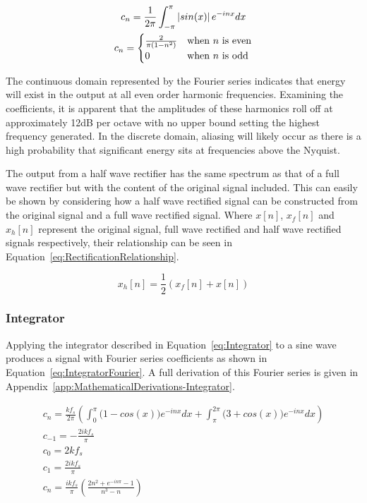 			\begin{gather}
				c_{n} = \frac{1}{2\pi} \int_{-\pi}^{\pi} \left|sin(x)\right|e^{-inx} dx \nonumber \\
				c_{n} = \begin{cases}
					\frac{2}{\pi(1 - n^{2})} & \text{when $n$ is even} \\
					0 & \text{when $n$ is odd}
				\end{cases}
				\label{eq:RectificationFourier}
			\end{gather}

			The continuous domain represented by the Fourier series indicates that energy will exist in the
			output at all even order harmonic frequencies. Examining the coefficients, it is apparent that the
			amplitudes of these harmonics roll off at approximately 12dB per octave with no upper bound setting
			the highest frequency generated. In the discrete domain, aliasing will likely occur as there is a
			high probability that significant energy sits at frequencies above the Nyquist.

			The output from a half wave rectifier has the same spectrum as that of a full wave rectifier but
			with the content of the original signal included. This can easily be shown by considering how a
			half wave rectified signal can be constructed from the original signal and a full wave rectified
			signal.  Where $x[n]$, $x_{f}[n]$ and $x_{h}[n]$ represent the original signal, full wave rectified
			and half wave rectified signals respectively, their relationship can be seen in
			Equation~\ref{eq:RectificationRelationship}.

			\begin{equation}
				x_{h}[n] = \frac{1}{2} \left( x_{f}[n] + x[n] \right)
				\label{eq:RectificationRelationship}
			\end{equation}

		\subsubsection*{Integrator}
			Applying the integrator described in Equation~\ref{eq:Integrator} to a sine wave produces a signal
			with Fourier series coefficients as shown in Equation~\ref{eq:IntegratorFourier}. A full derivation
			of this Fourier series is given in Appendix~\ref{app:MathematicalDerivations-Integrator}.

			\begin{gather}
				c_{n} = \frac{kf_{s}}{2\pi} \left( \int_{0}^{\pi} \bigl( 1 - cos(x) \bigr) e^{-inx} dx +
							\int_{\pi}^{2\pi} \bigl( 3 + cos(x) \bigr) 
							e^{-inx} dx \right) \nonumber \\
				c_{-1} = - \frac{2ikf_{s}}{\pi} \nonumber \\
				c_{0} = 2kf_{s} \nonumber \\
				c_{1} = \frac{2ikf_{s}}{\pi} \nonumber \\
				c_{n} = \frac{ikf_{s}}{\pi} \left( \frac{2n^{2} + e^{-in\pi} - 1}{n^{3} - n} \right)
				\label{eq:IntegratorFourier}
			\end{gather}

